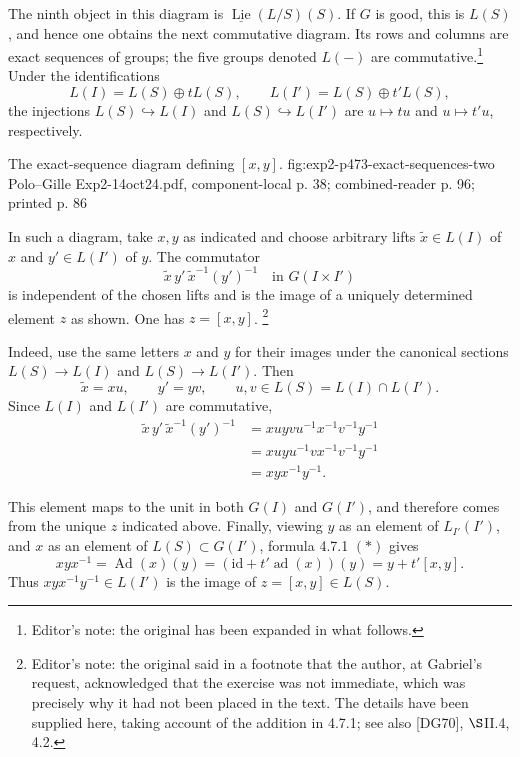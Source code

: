 The ninth object in this diagram is
\(\underline{\operatorname{Lie}}(L/S)(S)\). If \(G\) is good, this
is \(L(S)\), and hence one obtains the next commutative diagram. Its
rows and columns are exact sequences of groups; the five groups
denoted \(L(-)\) are commutative.\footnote{Editor's note: the original
has been expanded in what follows.} Under the identifications
\[
 L(I)=L(S)\oplus tL(S),
 \qquad
 L(I')=L(S)\oplus t'L(S),
\]
the injections \(L(S)\hookrightarrow L(I)\) and
\(L(S)\hookrightarrow L(I')\) are \(u\mapsto tu\) and
\(u\mapsto t'u\), respectively.

  {The exact-sequence diagram defining \([x,y]\).}
  {fig:exp2-p473-exact-sequences-two}
  {Polo--Gille Exp2-14oct24.pdf, component-local p. 38; combined-reader p. 96; printed p. 86}

In such a diagram, take \(x,y\) as indicated and choose arbitrary
lifts \(\widetilde x\in L(I)\) of \(x\) and \(y'\in L(I')\) of \(y\).
The commutator
\[
 \widetilde x\,y'\,\widetilde x^{-1}(y')^{-1}
 \quad\text{in }G(I\times I')
\]
is independent of the chosen lifts and is the image of a uniquely
determined element \(z\) as shown. One has \(z=[x,y]\).
\footnote{Editor's note: the original said in a footnote that the author,
at Gabriel's request, acknowledged that the exercise was not immediate,
which was precisely why it had not been placed in the text. The details
have been supplied here, taking account of the addition in 4.7.1; see
also [DG70], \(\S\)II.4, 4.2.}

Indeed, use the same letters \(x\) and \(y\) for their images under
the canonical sections \(L(S)\to L(I)\) and \(L(S)\to L(I')\).
Then
\[
 \widetilde x=xu,\qquad y'=yv,
 \qquad u,v\in L(S)=L(I)\cap L(I').
\]
Since \(L(I)\) and \(L(I')\) are commutative,
\[
\begin{aligned}
 \widetilde x\,y'\,\widetilde x^{-1}(y')^{-1}
 &=xuyvu^{-1}x^{-1}v^{-1}y^{-1}\\
 &=xuyu^{-1}vx^{-1}v^{-1}y^{-1}\\
 &=xyx^{-1}y^{-1}.
\end{aligned}
\]

This element maps to the unit in both \(G(I)\) and \(G(I')\), and
therefore comes from the unique \(z\) indicated above. Finally,
viewing \(y\) as an element of \(L_{I'}(I')\), and \(x\) as an
element of \(L(S)\subset G(I')\), formula 4.7.1 \((*)\) gives
\[
 xyx^{-1}
 =\operatorname{Ad}(x)(y)
 =(\mathrm{id}+t'\operatorname{ad}(x))(y)
 =y+t'[x,y].
\]
Thus \(xyx^{-1}y^{-1}\in L(I')\) is the image of
\(z=[x,y]\in L(S)\).


